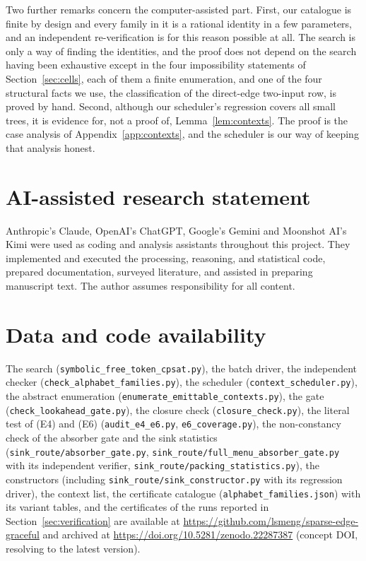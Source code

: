 \documentclass[11pt,a4paper]{article}
\theoremstyle{plain}
\theoremstyle{definition}
\theoremstyle{remark}
\newcommand{\file}[1]{\texttt{#1}}
\begin{document}
Two further remarks concern the computer-assisted part.  First, our
catalogue is finite by design and every family in it is a rational identity
in a few parameters, and an independent re-verification is for this reason
possible at all.  The search is only a way of finding the identities, and the
proof does not depend on the search having been exhaustive except in the four
impossibility statements of Section~\ref{sec:cells}, each of them a
finite enumeration, and one of the four structural facts we use, the
classification of the direct-edge two-input row, is proved by hand.  Second, although our scheduler's regression covers all
small trees, it is evidence for, not a proof of, Lemma~\ref{lem:contexts}.
The proof is the case analysis of Appendix~\ref{app:contexts}, and the
scheduler is our way of keeping that analysis honest.

\section{AI-assisted research statement}\label{sec:ai}

Anthropic's Claude, OpenAI's ChatGPT, Google's Gemini and Moonshot AI's Kimi
were used as coding and analysis assistants throughout this project.  They
implemented and executed the processing, reasoning, and statistical code,
prepared documentation, surveyed literature, and assisted in preparing
manuscript text.  The author assumes responsibility for all content.

\section{Data and code availability}\label{sec:data}

The search (\file{symbolic\_free\_token\_cpsat.py}), the batch driver, the
independent checker (\file{check\_alphabet\_families.py}), the scheduler
(\file{context\_scheduler.py}), the abstract enumeration
(\file{enumerate\_emittable\_contexts.py}), the gate
(\file{check\_lookahead\_gate.py}), the closure check
(\file{closure\_check.py}), the literal test of (E4) and (E6)
(\file{audit\_e4\_e6.py}, \file{e6\_coverage.py}), the non-constancy check of
the absorber gate and the sink statistics (\file{sink\_route/absorber\_gate.py},
\file{sink\_route/full\_menu\_absorber\_gate.py} with its
independent verifier,
\file{sink\_route/packing\_statistics.py}), the constructors (including
\file{sink\_route/sink\_constructor.py} with its regression driver), the context
list, the certificate catalogue (\file{alphabet\_families.json}) with its
variant tables, and the certificates of the runs reported in
Section~\ref{sec:verification} are available at
\url{https://github.com/lsmeng/sparse-edge-graceful} and archived at
\url{https://doi.org/10.5281/zenodo.22287387} (concept DOI, resolving to the
latest version).
\end{document}
